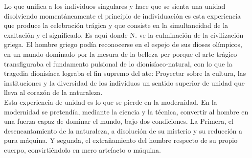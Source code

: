 \documentclass[a4paper, 10pt, twocolumn, spanish]{article}
\begin{document}
Lo que unifica a los individuos singulares y hace que se sienta una
unidad disolviendo momentáneamente el principio de individuación es
esta experiencia que produce la celebración trágica y que consiste en
la simultaneidad de la exaltación y el significado. Es aquí donde
N. ve la culminación de la civilización griega. El hombre griego podía
reconocerse en el espejo de sus dioses olímpicos, en un mundo dominado
por la mesura de la belleza per porque el arte trágico transfiguraba
el fundamento pulsional de lo dionisíaco-natural, con lo que la
tragedia dionisíaca lograba el fin supremo del ate: Proyectar sobre la
cultura, las instituciones y la diversidad de los individuos un
sentido superior de unidad que lleva al corazón de la naturaleza.\\[0pt]

Esta experiencia de unidad es lo que se pierde en la modernidad. En la
modernidad se pretendía, mediante la ciencia y la técnica, convertir
al hombre en una fuerza capaz de dominar el mundo, bajo dos
condiciones. La Primera, el desencantamiento de la naturaleza, a
disolución de su misterio y su reducción a pura máquina. Y segunda, el
extrañamiento del hombre respecto de su propio cuerpo, convirtiéndolo
en mero artefacto o máquina.\\[0pt]
\end{document}

